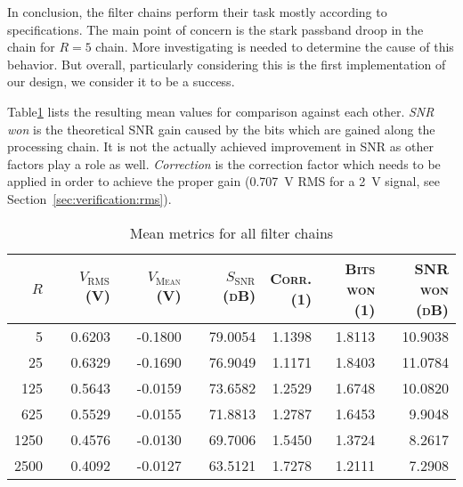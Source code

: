 In  conclusion, the  filter  chains  perform their  task  mostly according  to
specifications. The main point  of concern is the stark passband  droop in the
chain for $R=5$ chain. More investigating is  needed to determine the cause of
this  behavior. But  overall,  particularly  considering  this  is  the  first
implementation of our design, we consider it to be a success.

Table\ref{tab:verification:results}  lists  the   resulting  mean  values  for
comparison  against each  other. \emph{SNR  won} is  the theoretical  SNR gain
caused by the bits which are gained  along the processing chain. It is not the
actually achieved  improvement in SNR  as other factors  play a role  as well.
\emph{Correction} is the correction factor which  needs to be applied in order
to achieve the proper gain (\SI{0.707}{\volt} RMS for a \SI{2}{\V_}
signal, see Section~\ref{sec:verification:rms}).

\begin{table}
    \centering
    \caption[Mean Metrics for All Filter Chains]{Mean metrics for all filter chains}
    \label{tab:verification:results}
    \begin{tabular}{rrrrrrr}
        \toprule
        {\scshape $R$                 }& 
        {\scshape $V_\mathrm{RMS}$ (\si{V})  }& 
        {\scshape $V_\mathrm{Mean}$ (\si{V}) }& 
        {\scshape $S_\mathrm{SNR}$ (\si{dB}) }&  %
        {\parbox[t]{16mm}{\raggedleft\scshape Corr.\\(\si{1})}}& 
        {\parbox[t]{16mm}{\raggedleft\scshape Bits\\won (\si{1})}}& 
        {\parbox[t]{16mm}{\raggedleft\scshape SNR\\won (\si{dB})}}\\
        \midrule
        5           & 0.6203   & -0.1800   & 79.0054   & 1.1398   & 1.8113   & 10.9038\\
        25          & 0.6329   & -0.1690   & 76.9049   & 1.1171   & 1.8403   & 11.0784\\
        125         & 0.5643   & -0.0159   & 73.6582   & 1.2529   & 1.6748   & 10.0820\\
        625         & 0.5529   & -0.0155   & 71.8813   & 1.2787   & 1.6453   & 9.9048\\
        1250        & 0.4576   & -0.0130   & 69.7006   & 1.5450   & 1.3724   & 8.2617\\
        2500        & 0.4092   & -0.0127   & 63.5121   & 1.7278   & 1.2111   & 7.2908\\
        \bottomrule
    \end{tabular}
\end{table}


